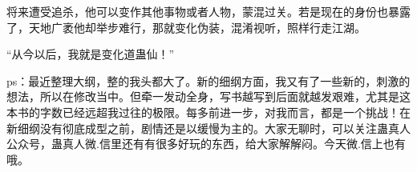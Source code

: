 \begin{this_body}
将来遭受追杀，他可以变作其他事物或者人物，蒙混过关。若是现在的身份也暴露了，天地广袤他却举步难行，那就变化伪装，混淆视听，照样行走江湖。

“从今以后，我就是变化道蛊仙！”

ps：最近整理大纲，整的我头都大了。新的细纲方面，我又有了一些新的，刺激的想法，所以在修改当中。但牵一发动全身，写书越写到后面就越发艰难，尤其是这本书的字数已经远超我过往的极限。每多前进一步，对我而言，都是一个挑战！在新细纲没有彻底成型之前，剧情还是以缓慢为主的。大家无聊时，可以关注蛊真人公众号，蛊真人微.信里还有有很多好玩的东西，给大家解解闷。今天微.信上也有哦。

\end{this_body}

